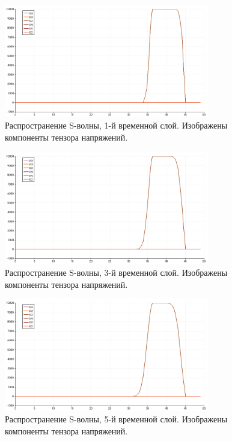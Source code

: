 \begin{figure}[htp]
\centering
\includegraphics[width=0.8\textwidth]{png/s-wave-test/s/0001.png}
\caption{Распространение S-волны, 1-й временной слой. Изображены компоненты тензора напряжений.}
\label{pic:s_wave_1}
\end{figure}

\begin{figure}[htp]
\centering
\includegraphics[width=0.8\textwidth]{png/s-wave-test/s/0003.png}
\caption{Распространение S-волны, 3-й временной слой. Изображены компоненты тензора напряжений.}
\end{figure}

\begin{figure}[htp]
\centering
\includegraphics[width=0.8\textwidth]{png/s-wave-test/s/0005.png}
\caption{Распространение S-волны, 5-й временной слой. Изображены компоненты тензора напряжений.}
\end{figure}

